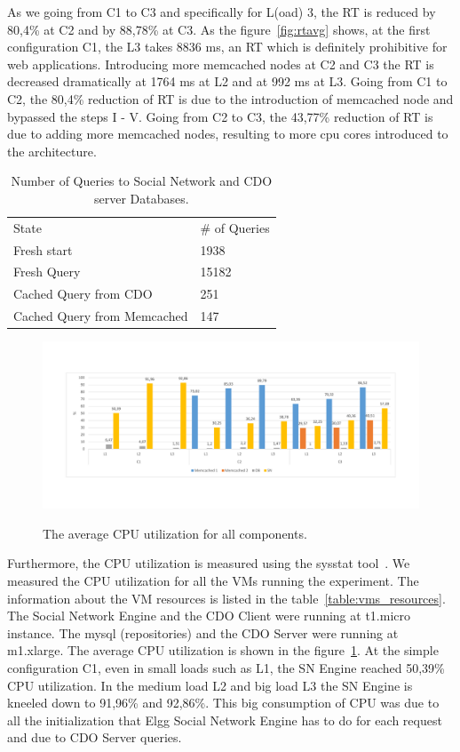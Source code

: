 As we going from C1 to C3 and specifically for L(oad) 3, the RT is reduced by 80,4\% at C2 and by 88,78\% at C3. As the figure~\ref{fig:rtavg} shows, at the first configuration C1, the L3 takes 8836 ms, an RT which is definitely prohibitive for web applications. Introducing more memcached nodes at C2 and C3 the RT is decreased dramatically at 1764 ms at L2 and at 992 ms at L3. Going from C1 to C2, the 80,4\% reduction of RT is due to the introduction of memcached node and bypassed the steps I - V. Going from C2 to C3, the 43,77\% reduction of RT is due to adding more memcached nodes, resulting to more cpu cores  introduced to the architecture.

\begin{table}[]
\centering
\caption{Number of Queries to Social Network and CDO server Databases.}
\label{tab:num_of_queries}
\begin{tabular}{ll}
State        & \# of Queries \\
Fresh start  & 1938          \\
Fresh Query  & 15182         \\
Cached Query from CDO & 251           \\
Cached Query from Memcached & 147  
\end{tabular}
\end{table} 

\begin{figure}[h]
	\caption{The average CPU utilization for all components.}
	\includegraphics[width=1\textwidth,natwidth=200,natheight=150]{./fig/UsageAVG.pdf}
	\centering
	\label{fig:cpuavg}
\end{figure}

Furthermore, the CPU utilization is measured using the sysstat tool~\cite{sysstat_url}. We measured the CPU utilization for all the VMs running the experiment. The information about the VM resources is listed in the table~\ref{table:vms_resources}. The Social Network Engine and the CDO Client were running at t1.micro instance. The mysql (repositories) and the CDO Server were running at m1.xlarge. The average CPU utilization is shown in the figure~\ref{fig:cpuavg}. At the simple configuration C1, even in small loads such as L1, the SN Engine reached 50,39\% CPU utilization. In the medium load L2 and big load L3 the SN Engine is kneeled down to 91,96\% and 92,86\%. This big consumption of CPU was due to all the initialization that Elgg Social Network Engine has to do for each request and due to CDO Server queries.

